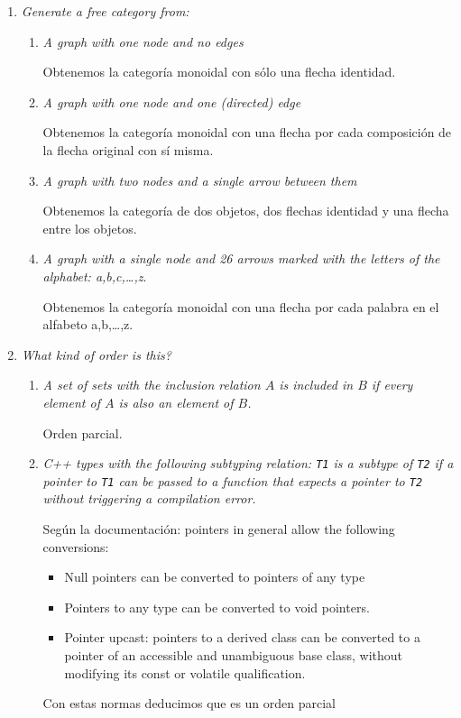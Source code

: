 \documentclass[11pt]{article}
\begin{document}
\begin{enumerate}
\item \textit{Generate a free category from:}
\begin{enumerate}
\item \textit{A graph with one node and no edges}

Obtenemos la categoría monoidal con sólo una flecha identidad.

\item \textit{A graph with one node and one (directed) edge}

Obtenemos la categoría monoidal con una flecha por cada composición de la flecha original con sí misma.

\item \textit{A graph with two nodes and a single arrow between them}

Obtenemos la categoría de dos objetos, dos flechas identidad y una flecha entre los objetos.

\item \textit{A graph with a single node and 26 arrows marked with the letters of the alphabet: a,b,c,\dots,z}.

Obtenemos la categoría monoidal con una flecha por cada palabra en el alfabeto a,b,\dots,z.
\end{enumerate}

\item \textit{What kind of order is this?}
\begin{enumerate}
\item \textit{A set of sets with the inclusion relation $A$ is included in $B$ if every element of $A$ is also an element of $B$.}

Orden parcial.

\item \textit{C++ types with the following subtyping relation: \texttt{T1} is a subtype of \texttt{T2} if a pointer to \texttt{T1} can be passed to a function that expects a pointer to \texttt{T2} without triggering a compilation error.}

Según la documentación: pointers in general allow the following conversions:
\begin{itemize}
\item Null pointers can be converted to pointers of any type
\item Pointers to any type can be converted to void pointers.
\item Pointer upcast: pointers to a derived class can be converted to a pointer of an accessible and unambiguous base class, without modifying its const or volatile qualification.
\end{itemize}
Con estas normas deducimos que es un orden parcial    
\end{enumerate}


\end{enumerate}
\end{document}
